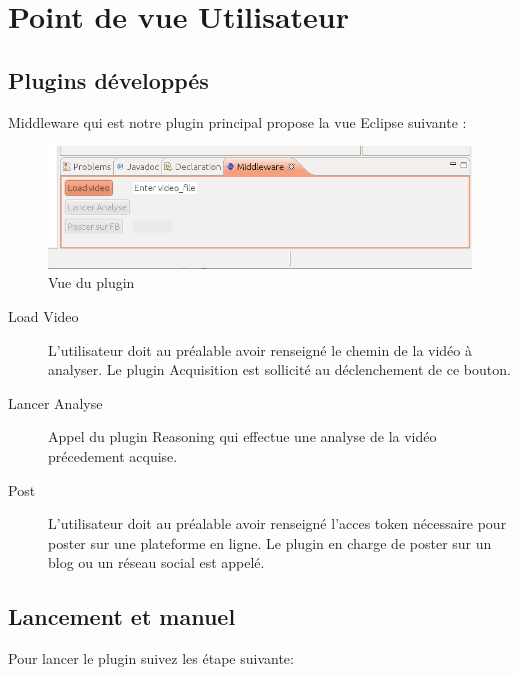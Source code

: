 \chapter{Point de vue Utilisateur}

\section{Plugins développés}
Middleware qui est notre plugin principal propose la vue Eclipse suivante : 
  \begin{figure}[h]
	  \centering
	  \includegraphics[scale=0.50]{img/Capture}
	  \caption{Vue du plugin}
	  \label{fig:vue}
\end{figure} 
\begin{description}
\item[Load Video]
L'utilisateur doit au préalable avoir renseigné le chemin de la vidéo à analyser. Le plugin Acquisition est sollicité au déclenchement de ce bouton. 
\item[Lancer Analyse]
Appel du plugin Reasoning qui effectue une analyse de la vidéo précedement acquise.
\item[Post]
L'utilisateur doit au préalable avoir renseigné l'acces token nécessaire pour poster sur une plateforme en ligne. 
Le plugin en charge de poster sur un blog ou un réseau social est appelé.
\end{description}
 
 \clearpage
 
\section{Lancement et manuel}
Pour lancer le plugin suivez les étape suivante:

